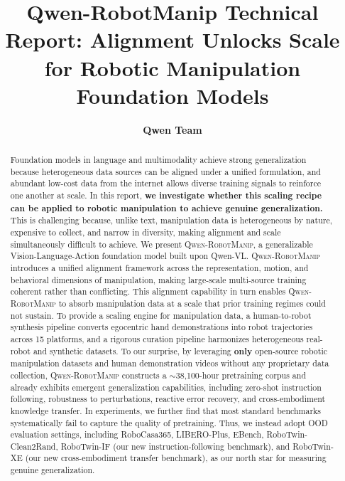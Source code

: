 \documentclass{article} %
\title{Qwen-RobotManip Technical Report: Alignment Unlocks Scale for Robotic Manipulation Foundation Models}
\author{
\bf Qwen Team}
\newcommand{\ours}{\textsc{Qwen-RobotManip}\xspace}
\begin{document}
\maketitle

  
\begin{abstract}
Foundation models in language and multimodality achieve strong generalization because heterogeneous data sources can be aligned under a unified formulation, and abundant low-cost data from the internet allows diverse training signals to reinforce one another at scale.
%
In this report, \textbf{we investigate whether this scaling recipe can be applied to robotic manipulation to achieve genuine generalization.}
This is challenging because, unlike text, manipulation data is heterogeneous by nature,
expensive to collect, and narrow in diversity, making alignment and scale simultaneously difficult to achieve.
We present \ours, a generalizable Vision-Language-Action foundation model built upon Qwen-VL.
\ours introduces a unified alignment framework across the representation, motion, and behavioral dimensions of manipulation, making large-scale multi-source training coherent rather than conflicting.
This alignment capability in turn enables \ours to absorb manipulation data at a scale that prior training regimes could not sustain.
To provide a scaling engine for manipulation data, a human-to-robot synthesis pipeline converts egocentric hand demonstrations into robot trajectories across 15 platforms, and a rigorous curation pipeline harmonizes heterogeneous real-robot and synthetic datasets.
To our surprise, by leveraging \textbf{only} open-source robotic manipulation datasets and human demonstration videos without any proprietary data collection, \ours constructs a $\sim$38,100-hour pretraining corpus and already exhibits emergent generalization capabilities, including zero-shot instruction following, robustness to perturbations, reactive error recovery, and cross-embodiment knowledge transfer.
In experiments, we further find that most standard benchmarks systematically fail to capture the quality of pretraining. Thus, we instead adopt OOD evaluation settings, including RoboCasa365, LIBERO-Plus, EBench, RoboTwin-Clean2Rand, RoboTwin-IF (our new instruction-following benchmark), and RoboTwin-XE (our new cross-embodiment transfer benchmark), as our north star for measuring genuine generalization.

\end{abstract}
\end{document}
